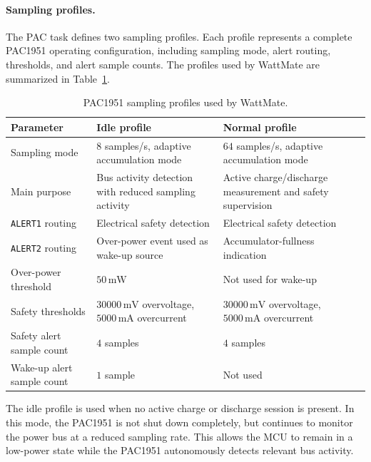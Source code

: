 \paragraph{Sampling profiles.}
The PAC task defines two sampling profiles. Each profile represents a complete PAC1951 operating configuration, including sampling mode, alert routing, thresholds, and alert sample counts. The profiles used by WattMate are summarized in Table~\ref{tab:pac_sampling_profiles}.

\begin{table}[H]
	\centering
	\small
	\caption{PAC1951 sampling profiles used by WattMate.}
	\label{tab:pac_sampling_profiles}
	\begin{tabularx}{\textwidth}{lXX}
		\toprule
		\textbf{Parameter} & \textbf{Idle profile} & \textbf{Normal profile} \\
		\midrule
		Sampling mode &
		\(8\) samples/s, adaptive accumulation mode &
		\(64\) samples/s, adaptive accumulation mode \\
		
		Main purpose &
		Bus activity detection with reduced sampling activity &
		Active charge/discharge measurement and safety supervision \\
		
		\texttt{ALERT1} routing &
		Electrical safety detection &
		Electrical safety detection \\
		
		\texttt{ALERT2} routing &
		Over-power event used as wake-up source &
		Accumulator-fullness indication \\
		
		Over-power threshold &
		\(50\,\mathrm{mW}\) &
		Not used for wake-up \\
		
		Safety thresholds &
		\(30000\,\mathrm{mV}\) overvoltage,
		\(5000\,\mathrm{mA}\) overcurrent &
		\(30000\,\mathrm{mV}\) overvoltage,
		\(5000\,\mathrm{mA}\) overcurrent \\
		
		Safety alert sample count &
		\(4\) samples &
		\(4\) samples \\
		
		Wake-up alert sample count &
		\(1\) sample &
		Not used \\
		\bottomrule
	\end{tabularx}
\end{table}

The idle profile is used when no active charge or discharge session is present. In this mode, the PAC1951 is not shut down completely, but continues to monitor the power bus at a reduced sampling rate. This allows the MCU to remain in a low-power state while the PAC1951 autonomously detects relevant bus activity.


